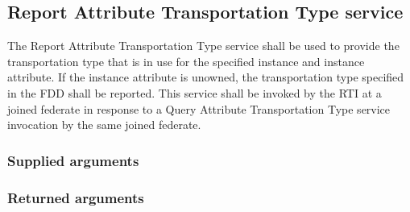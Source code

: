 \begin{compactstdpage}

    \subsection{Report Attribute Transportation Type \rtiinitiated{} service}


    The Report Attribute Transportation Type \rtiinitiated{} service shall be used to provide the transportation type that is in use for the specified instance and instance attribute. If the instance attribute is unowned, the transportation type specified in the FDD shall be reported. This service shall be invoked by the RTI at a joined federate in response to a Query Attribute Transportation Type service invocation by the same joined federate.

    \subsubsection{Supplied arguments}



    \subsubsection{Returned arguments}



\end{compactstdpage}

\clearpage

